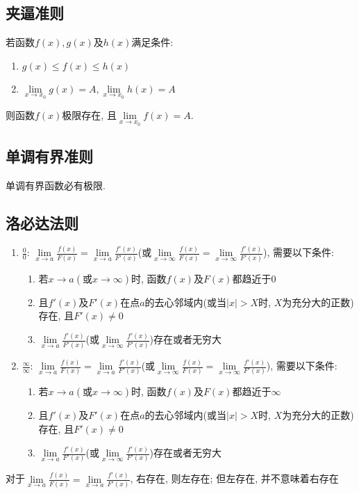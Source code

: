 \subsection{夹逼准则}\label{夹逼定理}
若函数$ f(x), g(x) $及$ h(x) $满足条件:
\begin{enumerate}
    \item $ g(x)\le f(x)\le h(x) $
    \item $ \lim\limits_{x\rightarrow x_{0}}g(x)=A, \lim\limits_{x\rightarrow x_{0}}h(x)=A $
\end{enumerate}\par
则函数$ f(x) $极限存在, 且$ \lim\limits_{x\rightarrow x_{0}}f(x)=A $.
\subsection{单调有界准则}
单调有界函数必有极限.
\subsection{洛必达法则}\label{洛必达法则}
\begin{enumerate}
    \item $ \frac{0}{0} $: $ \lim\limits_{x\rightarrow a}\frac{f(x)}{F(x)}=\lim\limits_{x\rightarrow a}\frac{f'(x)}{F'(x)} $(或$ \lim\limits_{x\rightarrow \infty}\frac{f(x)}{F(x)}=\lim\limits_{x\rightarrow \infty}\frac{f'(x)}{F'(x)} $), 需要以下条件:
          \begin{enumerate}
              \item 若$ x\rightarrow a(\text{或}x\rightarrow \infty) $时, 函数$ f(x) $及$ F(x) $都趋近于$ 0 $
              \item 且$ f'(x) $及$ F'(x) $在点$ a $的去心邻域内(或当$ |x|>X $时, $ X $为充分大的正数)存在, 且$ F'(x)\neq 0 $
              \item $ \lim\limits_{x\rightarrow a}\frac{f'(x)}{F'(x)} $(或$ \lim\limits_{x\rightarrow \infty}\frac{f'(x)}{F'(x)} $)存在或者无穷大
          \end{enumerate}
    \item $ \frac{\infty}{\infty} $: $ \lim\limits_{x\rightarrow a}\frac{f(x)}{F(x)}=\lim\limits_{x\rightarrow a}\frac{f'(x)}{F'(x)} $(或$ \lim\limits_{x\rightarrow \infty}\frac{f(x)}{F(x)}=\lim\limits_{x\rightarrow \infty}\frac{f'(x)}{F'(x)} $), 需要以下条件:
          \begin{enumerate}
              \item 若$ x\rightarrow a(\text{或}x\rightarrow \infty) $时, 函数$ f(x) $及$ F(x) $都趋近于$ \infty $
              \item 且$ f'(x) $及$ F'(x) $在点$ a $的去心邻域内(或当$ |x|>X $时, $ X $为充分大的正数)存在, 且$ F'(x)\neq 0 $
              \item $ \lim\limits_{x\rightarrow a}\frac{f'(x)}{F'(x)} $(或$ \lim\limits_{x\rightarrow \infty}\frac{f'(x)}{F'(x)} $)存在或者无穷大
          \end{enumerate}
\end{enumerate}
\begin{tcolorbox}
    对于$ \lim\limits_{x\rightarrow a}\frac{f(x)}{F(x)}=\lim\limits_{x\rightarrow a}\frac{f'(x)}{F'(x)} $, 右存在, 则左存在; 但左存在, 并不意味着右存在
\end{tcolorbox}
